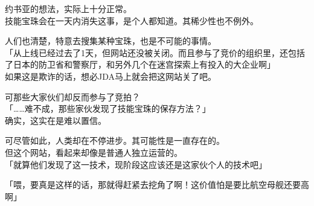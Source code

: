 约书亚的想法，实际上十分正常。\\

技能宝珠会在一天内消失这事，是个人都知道。其稀少性也不例外。

人们也清楚，特意去搜集某种宝珠，也是不可能的事情。\\

「从上线已经过去了1天，但网站还没被关闭。而且参与了竞价的组织里，还包括了日本的防卫省和警察厅，和另外几个在迷宫探索上有投入的大企业啊」\\

如果这是欺诈的话，想必JDA马上就会把这网站关了吧。

可那些大家伙们却反而参与了竞拍？\\

「……难不成，那些家伙发现了技能宝珠的保存方法？」\\

确实，这实在是难以置信。

可尽管如此，人类却在不停进步。其可能性是一直存在的。\\

但这个网站，看起来却像是普通人独立运营的。\\

「就算他们发现了这一技术，现阶段这应该还是这家伙个人的技术吧」

「喂，要真是这样的话，那就得赶紧去挖角了啊！这价值怕是要比航空母舰还要高啊」

